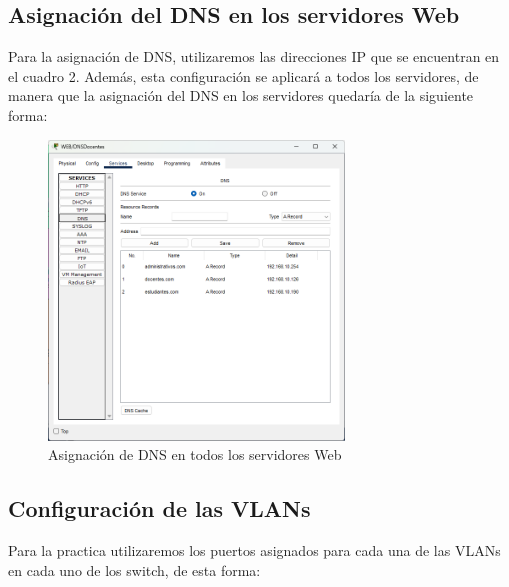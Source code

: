     \subsection*{Asignación del DNS en los servidores Web}
    Para la asignación de DNS, utilizaremos las direcciones IP que se encuentran en el cuadro 2. Además, esta configuración se aplicará a todos los servidores, de manera que la asignación del DNS en los servidores quedaría de la siguiente forma:
    \begin{figure}[H]
        \centering
        \includegraphics[width=0.7\textwidth]{img/dns.png}
        \caption{Asignación de DNS en todos los servidores Web}
        \label{fig:dns}
    \end{figure}

    \subsection*{Configuración de las VLANs}
    Para la practica utilizaremos los puertos asignados para cada una de las VLANs en cada uno de los switch, de esta forma:
    
